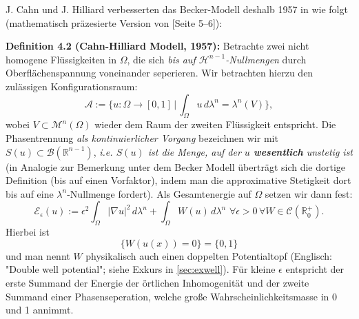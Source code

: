 J. Cahn und J. Hilliard verbesserten das Becker-Modell deshalb 1957 in \cite{CahnHilliard} wie folgt (mathematisch präzesierte Version von \cite{ambrosio2000variational}[Seite 5--6]):\\[0.5cm]
\colorbox{generalYellow}{\begin{minipage}{16cm}{\textcolor{black}{}{\label{def4.2}}}
\textbf{Definition 4.2 (Cahn-Hilliard Modell, 1957):} Betrachte zwei nicht homogene Flüssigkeiten in \(\Omega\), die sich \textit{bis auf \(\mathcal{H}^{n-1}\)-Nullmengen} durch Oberflächenspannung voneinander seperieren. Wir betrachten hierzu den zulässigen Konfigurationsraum:
\begin{equation}
    \mathcal{A} := \{u : \Omega \to [0,1] \, | \, \int_{\Omega} u \, d\lambda^n = \lambda^n(V) \},
\end{equation}
wobei \(V \subset \mathcal{M}^n(\Omega)\) wieder dem Raum der zweiten Flüssigkeit entspricht.
Die Phasentrennung \textit{als kontinuierlicher Vorgang} bezeichnen wir mit \(S(u) \subset \mathcal{B}(\mathbb{R}^{n-1})\), \textit{i.e. \(S(u)\) ist die Menge, auf der \(u\) \textbf{wesentlich} unstetig ist} (in Analogie zur Bemerkung unter dem Becker Modell überträgt sich die dortige Definition (bis auf einen Vorfaktor), indem man die approximative Stetigkeit dort bis auf eine \(\lambda^n\)-Nullmenge fordert). Als Gesamtenergie auf \(\Omega\) setzen wir dann fest:
\begin{equation}
    \mathcal{E}_{\epsilon}(u) := \epsilon^2 \int_{\Omega} |\nabla u |^2 \, d\lambda^n + \int_{\Omega} W(u) \, d\lambda^n \, \, \forall \epsilon > 0 \, \forall W \in \mathcal{C}(\mathbb{R}_0^+).
\end{equation}
Hierbei ist
\begin{equation}
\{W(u(x)) = 0\} = \{0,1\} 
\end{equation}
und man nennt \(W\) physikalisch auch einen doppelten Potentialtopf (Englisch: "Double well potential"; siehe Exkurs in \ref{sec:exwell}). Für kleine \(\epsilon\) entspricht der erste Summand der Energie der örtlichen Inhomogenität und der zweite Summand einer Phasenseperation, welche große Wahrscheinlichkeitsmasse in 0 und 1 annimmt.
\end{minipage}}

